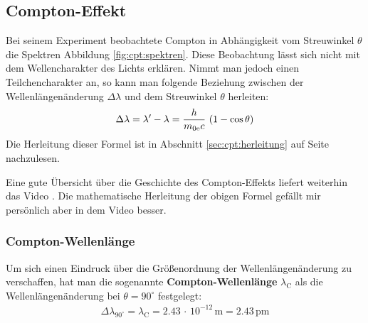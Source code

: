 \documentclass[a4paper, 10pt]{scrbook}
\newcommand\el{\text{e}}
\begin{document}
\subsection{Compton-Effekt}

Bei seinem Experiment beobachtete Compton in Abhängigkeit vom Streuwinkel $\theta$ die Spektren Abbildung \ref{fig:cpt:spektren}.
Diese Beobachtung lässt sich nicht mit dem Wellencharakter des Lichts erklären.
Nimmt man jedoch einen Teilchencharakter an, so kann man folgende Beziehung zwischen der Wellenlängenänderung $\Delta \lambda$ und dem Streuwinkel $\theta$ herleiten:
\begin{align}
 \Delta \lambda = \lambda' - \lambda = \frac{h}{m_{\text{0\el}} c}\, \left( 1 - \cos\theta \right)
 \label{equ:cpt:ComptonFormel}
\end{align}
Die Herleitung dieser Formel ist in Abschnitt \ref{sec:cpt:herleitung} auf Seite \pageref{sec:cpt:herleitung} nachzulesen.

Eine gute Übersicht über die Geschichte des Compton-Effekts liefert weiterhin das Video \cite{youtubeComptonEng}.
Die mathematische Herleitung der obigen Formel gefällt mir persönlich aber in dem Video \cite{youtubeComptonDeu} besser.

\subsubsection{Compton-Wellenlänge}

Um sich einen Eindruck über die Größenordnung der Wellenlängenänderung zu verschaffen, hat man die sogenannte {\bfseries Compton-Wellenlänge} $\lambda_\text{C}$ als die Wellenlängenänderung bei $\theta = 90^\circ$ festgelegt:
\begin{align}
  \Delta \lambda_{90^\circ} = \lambda_\text{C} = 2.43\,\cdot\, 10^{-12}\,\text{m}
  = 2.43\,\text{pm}
\end{align}
\end{document}

